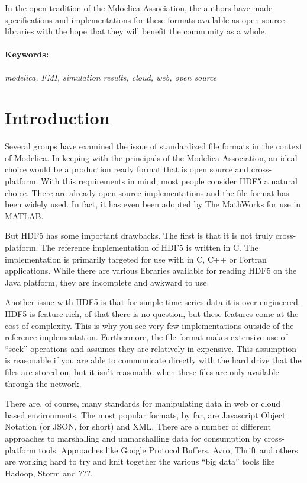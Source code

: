 \documentclass[11pt,a4paper,twocolumn]{article}
\begin{document}
In the open tradition of the Mdoelica Association, the authors have
made specifications and implementations for these formats available as
open source libraries with the hope that they will benefit the
community as a whole.

\paragraph{Keywords:}\emph{modelica, FMI, simulation results,
  cloud, web, open source}

\section{Introduction}
\label{sec:intro}

Several groups have examined the issue of standardized file formats
\cite{AndreasHDF5,GallHDF5} in the context of Modelica.  In keeping
with the principals of the Modelica Association, an ideal choice would
be a production ready format that is open source and cross-platform.
With this requirements in mind, most people consider HDF5 a natural
choice.  There are already open source implementations and the file
format has been widely used.  In fact, it has even been adopted by The
MathWorks for use in MATLAB.

But HDF5 has some important drawbacks.  The first is that it is not
truly cross-platform.  The reference implementation of HDF5 is written
in C.  The implementation is primarily targeted for use with in C, C++
or Fortran applications.  While there are various libraries available
for reading HDF5 on the Java platform\cite{HDFJava}, they are
incomplete and awkward to use.

Another issue with HDF5 is that for simple time-series data it is over
engineered.  HDF5 is feature rich, of that there is no question, but
these features come at the cost of complexity.  This is why you see
very few implementations outside of the reference implementation.
Furthermore, the file format makes extensive use of ``seek''
operations and assumes they are relatively in expensive.  This
assumption is reasonable if you are able to communicate directly with
the hard drive that the files are stored on, but it isn't reasonable
when these files are only available through the network.

There are, of course, many standards for manipulating data in web or
cloud based environments.  The most popular formats, by far, are
Javascript Object Notation (or JSON, for short) and XML.  There are a
number of different approaches to marshalling and unmarshalling data
for consumption by cross-platform tools.  Approaches like Google
Protocol Buffers\cite{GPB}, Avro\cite{Avro}, Thrift\cite{Thrift} and
others are working hard to try and knit together the various ``big
data'' tools like Hadoop\cite{Hadoop}, Storm\cite{Storm} and ???.
\end{document}
